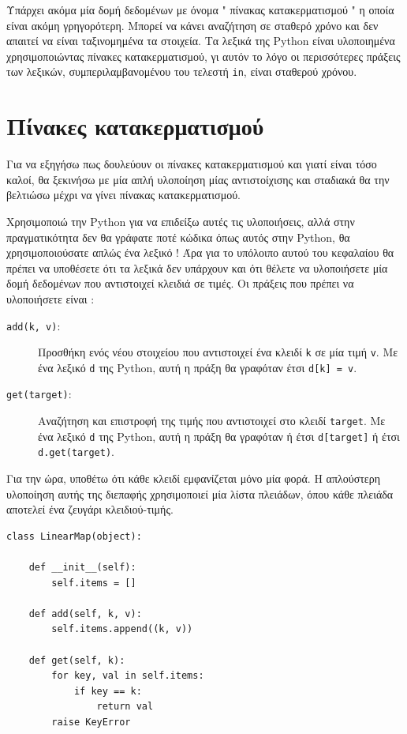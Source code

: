 \documentclass[10pt]{book}
\begin{document}
Υπάρχει ακόμα μία δομή δεδομένων με όνομα  " πίνακας κατακερματισμού "  
η οποία είναι ακόμη γρηγορότερη.  Μπορεί να κάνει αναζήτηση σε σταθερό χρόνο και δεν απαιτεί να είναι ταξινομημένα τα στοιχεία.  Τα λεξικά της  Python  είναι 
υλοποιημένα χρησιμοποιώντας πίνακες κατακερματισμού, γι αυτόν το λόγο οι περισσότερες πράξεις των λεξικών, συμπεριλαμβανομένου του τελεστή  {\tt in},  είναι σταθερού χρόνου.



\section{Πίνακες κατακερματισμού}
\label{hashtable}

Για να εξηγήσω πως δουλεύουν οι πίνακες κατακερματισμού και γιατί είναι τόσο 
καλοί, θα ξεκινήσω με μία απλή υλοποίηση μίας αντιστοίχισης και σταδιακά θα την 
βελτιώσω μέχρι να γίνει πίνακας κατακερματισμού.

Χρησιμοποιώ την  Python  για να επιδείξω αυτές τις υλοποιήσεις, αλλά στην 
πραγματικότητα δεν θα γράφατε ποτέ κώδικα όπως αυτός στην  Python,  θα χρησιμοποιούσατε απλώς ένα λεξικό !   Άρα για το υπόλοιπο αυτού του κεφαλαίου 
θα πρέπει να υποθέσετε ότι τα λεξικά δεν υπάρχουν και ότι θέλετε να υλοποιήσετε μία δομή δεδομένων που αντιστοιχεί κλειδιά σε τιμές. Οι πράξεις που πρέπει να υλοποιήσετε είναι :

\begin{description}

\item[{\tt add(k, v)}:]  Προσθήκη ενός νέου στοιχείου που αντιστοιχεί ένα κλειδί 
 {\tt k}  σε μία τιμή  {\tt v}.  Με ένα λεξικό  {\tt d}  της  Python,  αυτή η πράξη θα γραφόταν έτσι  {\tt d[k] = v}.

\item[{\tt get(target)}:]  Αναζήτηση και επιστροφή της τιμής που αντιστοιχεί στο 
κλειδί  {\tt target}.   Με ένα λεξικό  {\tt d}  της  Python,  αυτή η πράξη θα γραφόταν ή έτσι  {\tt d[target]}  ή έτσι  {\tt d.get(target)}.

\end{description}

 Για την ώρα, υποθέτω ότι κάθε κλειδί εμφανίζεται μόνο μία φορά.  Η απλούστερη 
υλοποίηση αυτής της διεπαφής χρησιμοποιεί μία λίστα πλειάδων, όπου κάθε πλειάδα αποτελεί ένα ζευγάρι κλειδιού-τιμής. 

\begin{verbatim}
class LinearMap(object):

    def __init__(self):
        self.items = []

    def add(self, k, v):
        self.items.append((k, v))

    def get(self, k):
        for key, val in self.items:
            if key == k:
                return val
        raise KeyError
\end{verbatim}
\end{document}
